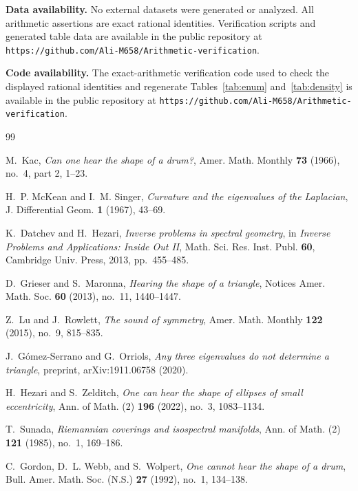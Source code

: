 \documentclass[12pt, letterpaper]{article}
\theoremstyle{definition}
\theoremstyle{plain}
\begin{document}
\smallskip
\noindent\textbf{Data availability.} No external datasets were generated or analyzed. All arithmetic assertions are exact rational identities. Verification scripts and generated table data are available in the public repository at \texttt{https://github.com/Ali-M658/Arithmetic-verification}.

\smallskip
\noindent\textbf{Code availability.} The exact-arithmetic verification code used to check the displayed rational identities and regenerate Tables~\ref{tab:enum} and~\ref{tab:density} is available in the public repository at \texttt{https://github.com/Ali-M658/Arithmetic-verification}.


\begin{thebibliography}{99}

M.~Kac, \emph{Can one hear the shape of a drum?}, Amer. Math. Monthly \textbf{73} (1966), no.~4, part 2, 1--23.

H.~P. McKean and I.~M. Singer, \emph{Curvature and the eigenvalues of the Laplacian}, J. Differential Geom. \textbf{1} (1967), 43--69.

K.~Datchev and H.~Hezari, \emph{Inverse problems in spectral geometry}, in \emph{Inverse Problems and Applications: Inside Out II}, Math. Sci. Res. Inst. Publ. \textbf{60}, Cambridge Univ. Press, 2013, pp.~455--485.

D.~Grieser and S.~Maronna, \emph{Hearing the shape of a triangle}, Notices Amer. Math. Soc. \textbf{60} (2013), no.~11, 1440--1447.

Z.~Lu and J.~Rowlett, \emph{The sound of symmetry}, Amer. Math. Monthly \textbf{122} (2015), no.~9, 815--835.

J.~G\'omez-Serrano and G.~Orriols, \emph{Any three eigenvalues do not determine a triangle}, preprint, arXiv:1911.06758 (2020).

H.~Hezari and S.~Zelditch, \emph{One can hear the shape of ellipses of small eccentricity}, Ann. of Math. (2) \textbf{196} (2022), no.~3, 1083--1134.

T.~Sunada, \emph{Riemannian coverings and isospectral manifolds}, Ann. of Math. (2) \textbf{121} (1985), no.~1, 169--186.

C.~Gordon, D.~L. Webb, and S.~Wolpert, \emph{One cannot hear the shape of a drum}, Bull. Amer. Math. Soc. (N.S.) \textbf{27} (1992), no.~1, 134--138.


\end{thebibliography}
\end{document}
